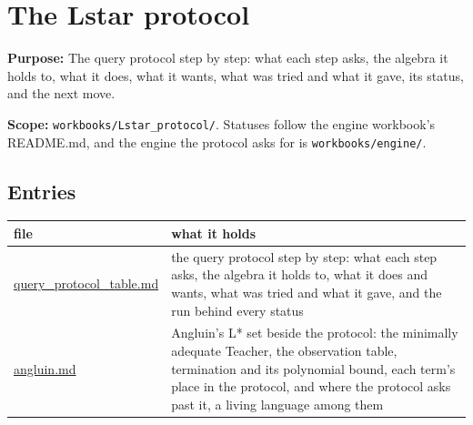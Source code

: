 \chapter{\texorpdfstring{The Lstar protocol}{The Lstar protocol}}
\label{chap:readme}

\textbf{Purpose:} The query protocol step by step: what each step asks, the algebra it holds to, what it does, what it wants, what was tried and what it gave, its status, and the next move.

\textbf{Scope:} \texttt{workbooks/\allowbreak{}Lstar\_\allowbreak{}protocol/\allowbreak{}}. Statuses follow the engine workbook's README.md, and the engine the protocol asks for is \texttt{workbooks/\allowbreak{}engine/\allowbreak{}}.

\section{\texorpdfstring{Entries}{Entries}}

{\small
\setlength{\tabcolsep}{6pt}
\begin{longtable}{>{\RaggedRight\arraybackslash}p{}>{\RaggedRight\arraybackslash}p{}}
\toprule
file & what it holds \\
\midrule
\endhead
\hyperref[chap:query-protocol-table]{query\_\allowbreak{}protocol\_\allowbreak{}table.md} & the query protocol step by step: what each step asks, the algebra it holds to, what it does and wants, what was tried and what it gave, and the run behind every status \\
\hyperref[chap:angluin]{angluin.md} & Angluin's L* set beside the protocol: the minimally adequate Teacher, the observation table, termination and its polynomial bound, each term's place in the protocol, and where the protocol asks past it, a living language among them \\
\bottomrule
\end{longtable}
}
